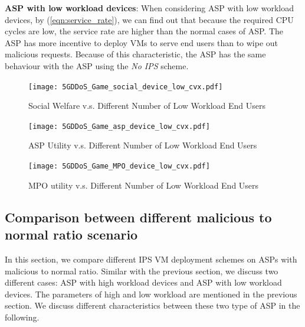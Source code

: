 \documentclass[conference]{IEEEtran}
\begin{document}


\textbf{ASP with low workload devices}:
When considering ASP with low workload devices, by (\ref{eqn:service_rate}), we can find out that because the required CPU cycles are low, the service rate are higher than the normal cases of ASP. The ASP has more incentive to deploy VMs to serve end users than to wipe out malicious requests. Because of this characteristic, the ASP has the same behaviour with the ASP using the \textit{No IPS} scheme.
\begin{figure}[!ht]
  \texttt{[image: 5GDDoS\_Game\_social\_device\_low\_cvx.pdf]}
    \caption{Social Welfare v.s. Different Number of Low Workload End Users}
\label{fig:num_cmp_soc_low}
\end{figure}

\begin{figure}[!ht]
  \texttt{[image: 5GDDoS\_Game\_asp\_device\_low\_cvx.pdf]}
    \caption{ASP Utility v.s. Different Number of Low Workload End Users}
\label{fig:num_cmp_asp_low}
\end{figure}

\begin{figure}[!ht]
  \texttt{[image: 5GDDoS\_Game\_MPO\_device\_low\_cvx.pdf]}
    \caption{MPO utility v.s. Different Number of Low Workload End Users}
\label{fig:num_cmp_mpo_low}
\end{figure}


\subsection{Comparison between different malicious to normal ratio scenario}
In this section, we compare different IPS VM deployment schemes on ASPs with malicious to normal ratio. Similar with the previous section, we discuss two different cases: ASP with high workload devices and ASP with low workload devices. The parameters of high and low workload are mentioned in the previous section. We discuss different characteristics between these two type of ASP in the following. 
\end{document}
